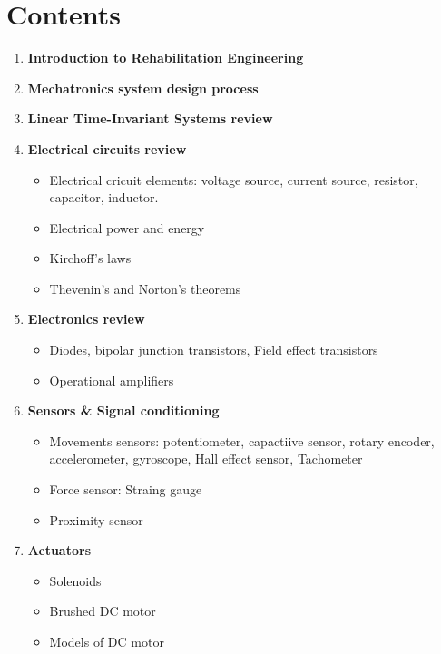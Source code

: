 \chapter{Contents}\label{chp:contents}



\begin{enumerate}
    \item \textbf{Introduction to Rehabilitation Engineering}
    \item \textbf{Mechatronics system design process}
    \item \textbf{Linear Time-Invariant Systems review}
    \item \textbf{Electrical circuits review}
    \begin{itemize}
        \item Electrical cricuit elements: voltage source, current source, resistor, capacitor, inductor.
        \item Electrical power and energy
        \item Kirchoff's laws
        \item Thevenin's and Norton's theorems 
    \end{itemize}
    \item \textbf{Electronics review}
    \begin{itemize}
        \item Diodes, bipolar junction transistors, Field effect transistors
        \item Operational amplifiers
    \end{itemize}
    \item \textbf{Sensors \& Signal conditioning}
    \begin{itemize}
        \item Movements sensors: potentiometer, capactiive sensor, rotary encoder, accelerometer, gyroscope, Hall effect sensor, Tachometer
        \item Force sensor: Straing gauge
        \item Proximity sensor
    \end{itemize}
    \item \textbf{Actuators}
    \begin{itemize}
        \item Solenoids
        \item Brushed DC motor
        \item Models of DC motor

\end{itemize}
\end{enumerate}
